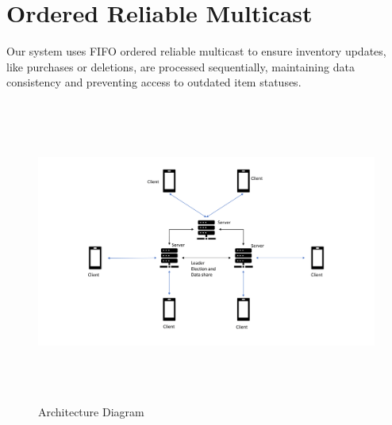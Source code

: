 \section{Ordered Reliable Multicast} \label{sec:OrderedReliableMulticast}
Our system uses FIFO ordered reliable multicast to ensure inventory updates, like purchases or deletions, are processed sequentially, maintaining data consistency and preventing access to outdated item statuses.

\begin{figure}[h!]
        \includegraphics[height=10cm, width=18cm]{images/Architecture.png}
        \caption{Architecture Diagram}
        \label{fig:architecture}
\end{figure}
